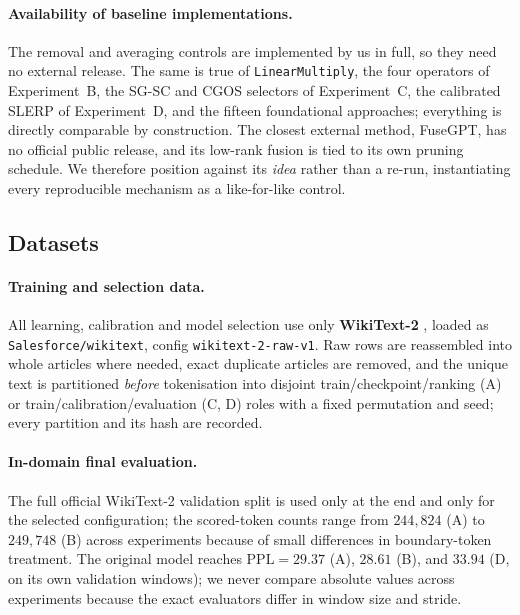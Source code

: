 \documentclass[10pt,a4paper]{article}
\newcommand{\linop}{\texttt{LinearMultiply}}
\begin{document}
\paragraph{Availability of baseline implementations.} The removal and averaging
controls are implemented by us in full, so they need no external release. The
same is true of \linop{}, the four operators of Experiment~B, the SG-SC and CGOS
selectors of Experiment~C, the calibrated SLERP of Experiment~D, and the fifteen
foundational approaches; everything is directly comparable by construction. The
closest external method, FuseGPT, has no official public release, and its
low-rank fusion is tied to its own pruning schedule. We therefore position
against its \emph{idea} rather than a re-run, instantiating every reproducible
mechanism as a like-for-like control.

\subsection{Datasets}
\label{sec:datasets}

\paragraph{Training and selection data.} All learning, calibration and model
selection use only \textbf{WikiText-2} \citep{merity2016pointer}, loaded as
\texttt{Salesforce/wikitext}, config \texttt{wikitext-2-raw-v1}. Raw rows are
reassembled into whole articles where needed, exact duplicate articles are
removed, and the unique text is partitioned \emph{before} tokenisation into
disjoint train/checkpoint/ranking (A) or train/calibration/evaluation (C, D)
roles with a fixed permutation and seed; every partition and its hash are
recorded.

\paragraph{In-domain final evaluation.} The full official WikiText-2 validation
split is used only at the end and only for the selected configuration; the
scored-token counts range from $244{,}824$ (A) to $249{,}748$ (B) across
experiments because of small differences in boundary-token treatment. The
original model reaches $\mathrm{PPL}=29.37$ (A), $28.61$ (B), and $33.94$ (D, on
its own validation windows); we never compare absolute values across experiments
because the exact evaluators differ in window size and stride.
\end{document}
